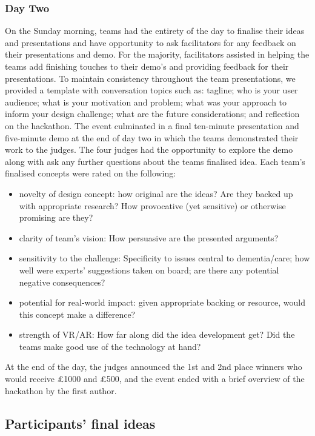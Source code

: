 \subsubsection{Day Two}
\label{DayTwo}
On the Sunday morning, teams had the entirety of the day to finalise their ideas and presentations and have opportunity to ask facilitators for any feedback on their presentations and demo. For the majority, facilitators assisted in helping the teams add finishing touches to their demo’s and providing feedback for their presentations. To maintain consistency throughout the team presentations, we provided a template with conversation topics such as: tagline; who is your user audience; what is your motivation and problem; what was your approach to inform your design challenge; what are the future considerations; and reflection on the hackathon. The event culminated in a final ten-minute presentation and five-minute demo at the end of day two in which the teams demonstrated their work to the judges. The four judges had the opportunity to explore the demo along with ask any further questions about the teams finalised idea. Each team’s finalised concepts were rated on the following:
\begin{itemize}
\item novelty of design concept: how original are the ideas? Are they backed up with appropriate research? How provocative (yet sensitive) or otherwise promising are they?
\item clarity of team's vision: How persuasive are the presented arguments?
\item sensitivity to the challenge: Specificity to issues central to dementia/care; how well were experts’ suggestions taken on board; are there any potential negative consequences?
\item potential for real-world impact: given appropriate backing or resource, would this concept make a difference?
\item strength of VR/AR: How far along did the idea development get? Did the teams make good use of the technology at hand? 
\end{itemize}

At the end of the day, the judges announced the 1st and 2nd place winners who would receive £1000 and £500, and the event ended with a brief overview of the hackathon by the first author. 

\subsection{Participants' final ideas}
\label{sec:EventIdeas}

